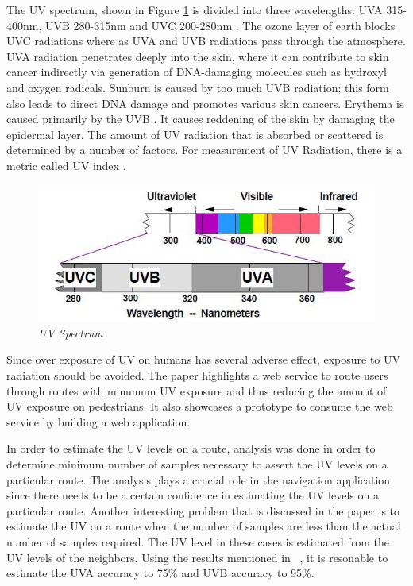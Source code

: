 \documentclass[12pt,fullpage,doublespace]{article}
\begin{document}
The UV spectrum, shown in Figure \ref{fig:uvSpectrum} is divided into three wavelengths: UVA 315-400nm, UVB 280-315nm and UVC 200-280nm \cite{dep4}. The ozone layer of earth blocks UVC radiations where as UVA and UVB radiations pass through the atmosphere. UVA radiation penetrates deeply into the skin, where it can contribute to skin cancer indirectly via generation of DNA-damaging molecules such as hydroxyl and oxygen radicals. Sunburn is caused by too much UVB radiation; this form also leads to direct DNA damage and promotes various skin cancers. Erythema is caused primarily by the UVB \cite{dep3}. It causes reddening of the skin by damaging the epidermal layer. The amount of UV radiation that is absorbed or scattered is determined by a number of factors. For measurement of UV Radiation, there is a metric called UV index \cite{dep5}. 
\begin{figure}
\begin{center}
\includegraphics[scale=0.40]{uvSpectrum.png}
\caption{\small \sl UV Spectrum\label{fig:uvSpectrum}}
\end{center}
\end{figure}


Since over exposure of UV on humans has several adverse effect, exposure to UV radiation should be avoided. The paper highlights a web service to route users through routes with minumum UV exposure and thus reducing the amount of UV exposure on pedestrians. It also showcases a prototype to consume the web service by building a web application. 

In order to estimate the UV levels on a route, analysis was done in order to determine minimum number of samples necessary to assert the UV levels on a particular route. The analysis plays a crucial role in the navigation application since there needs to be a certain confidence in estimating the UV levels on a particular route. Another interesting problem that is discussed in the paper is to estimate the UV on a route when the number of samples are less than the actual number of samples required. The UV level in these cases is estimated from the UV levels of the neighbors. Using the results mentioned in ~\cite{uvguardian}, it is resonable to estimate the UVA accuracy to 75\% and UVB accuracy to 95\%. 
\end{document}
